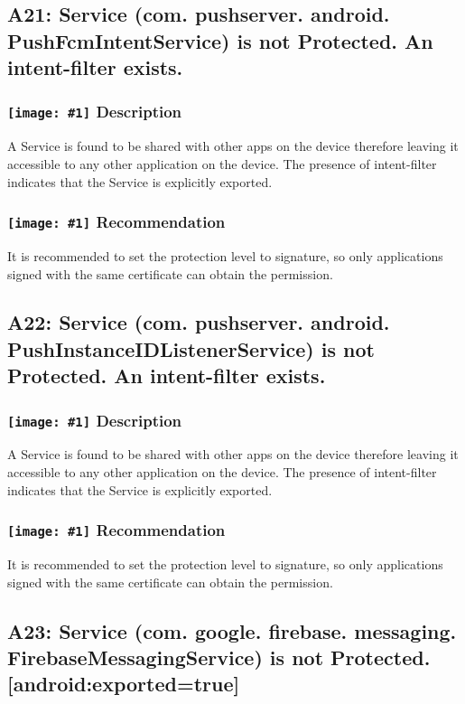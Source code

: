 \documentclass[12p]{article}
\newcommand{\icon}[1]{\texttt{[image: \#1]}}
\begin{document}
\subsection{A21: Service (com. pushserver. android. PushFcmIntentService) is not Protected. An intent-filter exists.}
\subsubsection*{\protect\icon{/home/miki/Documents/GITHUB/AndroidPermissions/python/vulns/report_icons/basic_sheet.png} Description}
A  Service is found to be shared with other apps on the device therefore leaving it accessible to any other application on the device. The presence of intent-filter indicates that the Service is explicitly exported.
\subsubsection*{\protect\icon{/home/miki/Documents/GITHUB/AndroidPermissions/python/vulns/report_icons/basic_todo.png} Recommendation}
It is recommended to set the protection level to signature, so only applications signed with the same certificate can obtain the permission.
\subsection{A22: Service (com. pushserver. android. PushInstanceIDListenerService) is not Protected. An intent-filter exists.}
\subsubsection*{\protect\icon{/home/miki/Documents/GITHUB/AndroidPermissions/python/vulns/report_icons/basic_sheet.png} Description}
A  Service is found to be shared with other apps on the device therefore leaving it accessible to any other application on the device. The presence of intent-filter indicates that the Service is explicitly exported.
\subsubsection*{\protect\icon{/home/miki/Documents/GITHUB/AndroidPermissions/python/vulns/report_icons/basic_todo.png} Recommendation}
It is recommended to set the protection level to signature, so only applications signed with the same certificate can obtain the permission.
\subsection{A23: Service (com. google. firebase. messaging. FirebaseMessagingService) is not Protected. [android:exported=true]}
\end{document}

